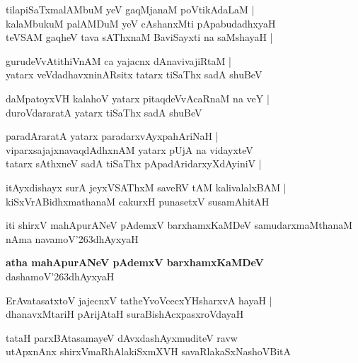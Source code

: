 \begin{shloka}
tilapiSaTxmalAMbuM yeV gaqMjanaM poVtikAdaLaM |\\
kalaMbukuM palAMDuM yeV cAshanxMti pApabudadhxyaH\\
teVSAM gaqheV tava sAThxnaM BaviSayxti na saMshayaH |
\end{shloka}

\begin{shloka}
gurudeVvAtithiVnAM ca yajacnx dAnavivajiRtaM |\\
yatarx veVdadhavxninARsitx tatarx tiSaThx sadA shuBeV
\end{shloka}

\begin{shloka}
daMpatoyxVH kalahoV yatarx pitaqdeVvAcaRnaM na veY |\\
duroVdararatA yatarx tiSaThx sadA shuBeV
\end{shloka}

\begin{shloka}
paradAraratA yatarx paradarxvAyxpahAriNaH |\\
viparxsajajxnavaqdAdhxnAM yatarx pUjA na vidayxteV \\
tatarx sAthxneV sadA tiSaThx pApadAridarxyXdAyiniV |
\end{shloka}

\begin{shloka}
itAyxdishayx surA jeyxVSAThxM saveRV tAM kalivalalxBAM |\\
kiSxVrABidhxmathanaM cakurxH punasetxV susamAhitAH
\end{shloka}
iti shirxV mahApurANeV pAdemxV barxhamxKaMDeV samudarxmaMthanaM nAma navamoV\char'263dhAyxyaH

\begin{center}
\textbf{\large atha mahApurANeV pAdemxV barxhamxKaMDeV}\\
dashamoV\char'263dhAyxyaH
\end{center}

\setcounter{shloka}{0}
\begin{shloka}
ErAvatasatxtoV jajecnxV tatheYvoVcecxYHsharxvA hayaH |\\
dhanavxMtariH pArijAtaH suraBishAcxpasxroVdayaH
\end{shloka}

\begin{shloka}
tataH parxBAtasamayeV dAvxdashAyxmuditeV ravw\\
utApxnAnx shirxVmaRhAlakiSxmXVH savaRlakaSxNashoVBitA
\end{shloka}

